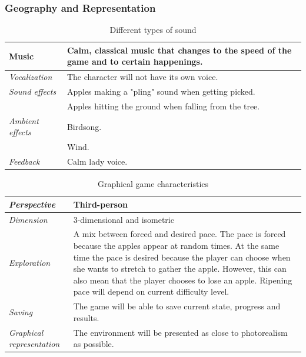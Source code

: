 \subsubsection{Geography and Representation}

\begin{table} [H]
\centering
\begin{tabular}{|p{}|p{}|}
\hline
{Music} & Calm, classical music that changes to the speed of the game and to certain happenings. \\ \hline
\emph{Vocalization} & The character will not have its own voice. \\ \hline
\emph{Sound effects} & Apples making a "pling" sound when getting picked.  \\ \cline{2-2}
&  Apples hitting the ground when falling from the tree. \\ \hline
\emph{Ambient effects} & Birdsong. \\ \cline{2-2}
& Wind. \\ \hline
\emph{Feedback} & Calm lady voice. \\ \hline
\end{tabular}
\caption[Different types of sounds in the "Apple Picking" game]{Different types of sound}
\label{tab:sound2}
\end{table}  

\begin{table} [H]
\centering
\begin{tabular}{|p{}|p{}|}
\hline
\emph {Perspective} & Third-person \\ \hline
\emph{Dimension} &  3-dimensional and isometric \\ \hline
\emph{Exploration} &  A mix between forced and desired pace. The pace is forced because the apples appear at random times. At the same time the pace is desired because the player can choose when she wants to stretch to gather the apple. However, this can also mean that the player chooses to lose an apple. Ripening pace will depend on current difficulty level.\\ \hline
\emph{Saving} & The game will be able to save current state, progress and results. \\ \hline
\emph{Graphical representation} & The environment will be presented as close to photorealism as possible.  \\ \hline
\end{tabular}
\caption[Graphical game characteristics in the "Apple Picking" game]{Graphical game characteristics}
\label{tab:graphical2}
\end{table}  

